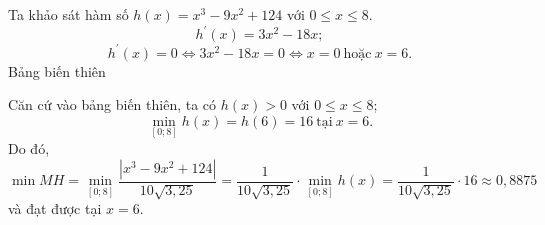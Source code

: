 \begin{ex}
{			Ta khảo sát hàm số $h(x)=x^3-9x^2+124$ với $0\leq x\leq 8$.
			\[h^\prime(x)=3x^2-18x;\]
			\[h^\prime(x)=0\Leftrightarrow 3x^2-18x=0 \Leftrightarrow x=0 \ \text{hoặc} \ x= 6.\]
			Bảng biến thiên 
			\begin{center}
			\end{center}
			Căn cứ vào bảng biến thiên, ta có $h(x)>0$ với $0\leq x\leq 8$;
			\[\min\limits_{[0;8]} h(x)=h(6)=16 \ \text{tại}\  x=6.\]
			Do đó, $\min MH=\min\limits_{[0;8]} \dfrac{\left|x^3-9x^2+124\right|}{10\sqrt{3{,}25}}=\dfrac{1}{10\sqrt{3{,}25}}\cdot \min\limits_{[0;8]} h(x)=\dfrac{1}{10\sqrt{3{,}25}}\cdot 16\approx0{,}8875$ và đạt được tại $x=6$.
	}
\end{ex}

